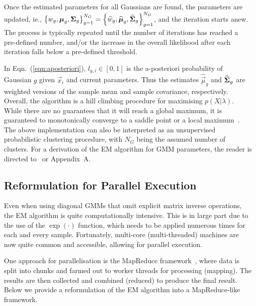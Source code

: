 \noindent
Once the estimated parameters for all Gaussians are found, the parameters are updated,
ie., {\small $\left\{ w_g, {\boldsymbol{\mu}}_g, {\boldsymbol{\Sigma}}_g \right\}_{g=1}^{N_G} = \left\{ \widehat{w}_g, \widehat{{\boldsymbol{\mu}}}_g, \widehat{{\boldsymbol{\Sigma}}}_g \right\}_{g=1}^{N_G}$},
and the iteration starts anew.
The process is typically repeated until the number of iterations has reached a pre-defined number,
and/or the increase in the overall likelihood after each iteration falls below a pre-defined threshold.

\noindent In Eqn.~(\ref{eqn:aposteriori}), $l_{g,i} \in [0,1]$ is the {a-posteriori} probability of Gaussian $g$ given $\Vec{x}_i$ and current parameters.
Thus the estimates $\widehat{\Vec{\mu}}_g$ and $\widehat{{\boldsymbol{\Sigma}}}_g$ are weighted versions of the
sample mean and sample covariance, respectively.
Overall, the algorithm is a hill climbing procedure for maximising $p(X | \lambda)$.
While there are no guarantees that it will reach a global maximum, it is guaranteed to monotonically converge to a saddle point or a local maximum~\cite{Dempster77,Duda01,Mitchell97}.
The above implementation can also be interpreted as an unsupervised probabilistic clustering procedure,
with $N_G$ being the assumed number of clusters.
For a derivation of the EM algorithm for GMM parameters, the reader is directed to~\cite{Bilmes98,Redner84} or Appendix~A. %


\subsection{Reformulation for Parallel Execution}
\label{sec:param_em_parallel}

Even when using diagonal GMMs that omit explicit matrix inverse operations, the EM algorithm is quite computationally intensive.
This is in large part due to the use of the $\exp(\cdot)$ function, which needs to be applied numerous times for each and every sample.
Fortunately, multi-core (multi-threaded) machines are now quite common and accessible, allowing for parallel execution.

One approach for parallelisation is the MapReduce framework~\cite{MapReduce_2004},
where data is split into chunks and farmed out to worker threads for processing (mapping).
The results are then collected and combined (reduced) to produce the final result.
Below we provide a reformulation of the EM algorithm into a MapReduce-like framework.

